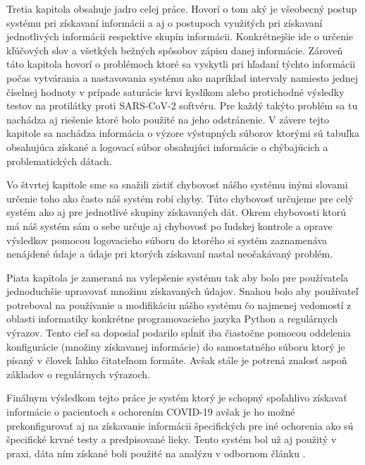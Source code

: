 Tretia kapitola obsahuje jadro celej práce. Hovorí o tom aký je všeobecný postup systému pri získavaní informácii a aj o postupoch využitých pri získavaní jednotlivých informácii respektíve skupín informácii. Konkrétnejšie ide o určenie kľúčových slov a všetkých bežných spôsobov zápisu danej informácie. Zároveň táto kapitola hovorí o problémoch ktoré sa vyskytli pri hľadaní týchto informácii počas vytvárania a nastavovania systému ako napríklad intervaly namiesto jednej číselnej hodnoty v prípade saturácie krvi kyslíkom alebo protichodné výsledky testov na protilátky proti SARS-CoV-2  softvéru. Pre každý takýto problém sa tu nachádza aj riešenie ktoré bolo použité na jeho odstránenie. V závere tejto kapitole sa nachádza informácia o výzore výstupných súborov ktorými sú tabuľka obsahujúca získané a logovací súbor obsahujúci informácie o chýbajúcich a problematických dátach. 

Vo štvrtej kapitole sme sa snažili zistiť chybovosť nášho systému inými slovami určenie toho ako často náš systém robí chyby. Túto chybovosť určujeme pre celý systém ako aj pre jednotlivé skupiny získavaných dát. Okrem chybovosti ktorú má náš systém sám o sebe určuje aj chybovosť po ľudskej kontrole a oprave výsledkov pomocou logovacieho súboru do ktorého si systém zaznamenáva nenájdené údaje a údaje pri ktorých získavaní nastal neočakávaný problém.

Piata kapitola je zameraná na vylepšenie systému tak aby bolo pre používateľa jednoduchšie upravovať množinu získavaných údajov. Snahou bolo aby používateľ potreboval na používanie a modifikáciu nášho systému čo najmenej vedomostí z oblasti informatiky konkrétne programovacieho jazyka Python a regulárnych výrazov. Tento cieľ sa doposiaľ podarilo spĺniť iba čiastočne pomocou oddelenia konfigurácie (množiny získavanej informácie) do samostatného súboru ktorý je písaný v človek ľahko čitateľnom formáte. Avšak stále je potrená znalosť aspoň základov o regulárnych výrazoch.

Finálnym výsledkom tejto práce je systém ktorý je schopný spoľahlivo získavať informácie o pacientoch s ochorením COVID-19 avšak je ho možné prekonfigurovať aj na získavanie informácii špecifických pre iné ochorenia ako sú špecifické krvné testy a predpisované lieky. Tento systém bol už aj použitý v praxi, dáta ním získané boli použité na analýzu v odbornom článku \cite{sabaka}. 